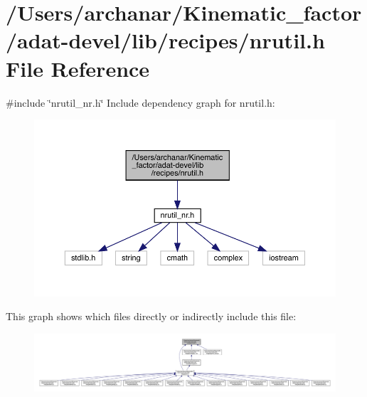 \hypertarget{adat-devel_2lib_2recipes_2nrutil_8h}{}\section{/\+Users/archanar/\+Kinematic\+\_\+factor/adat-\/devel/lib/recipes/nrutil.h File Reference}
\label{adat-devel_2lib_2recipes_2nrutil_8h}
{\ttfamily \#include \char`\"{}nrutil\+\_\+nr.\+h\char`\"{}}\newline
Include dependency graph for nrutil.\+h\+:
\nopagebreak
\begin{figure}[H]
\begin{center}
\leavevmode
\includegraphics[width=350pt]{dc/dfe/adat-devel_2lib_2recipes_2nrutil_8h__incl}
\end{center}
\end{figure}
This graph shows which files directly or indirectly include this file\+:
\nopagebreak
\begin{figure}[H]
\begin{center}
\leavevmode
\includegraphics[width=350pt]{d7/d05/adat-devel_2lib_2recipes_2nrutil_8h__dep__incl}
\end{center}
\end{figure}
